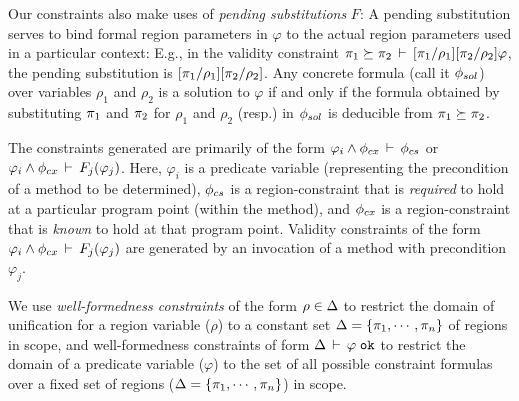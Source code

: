 
Our constraints also make uses of \emph{pending substitutions} $F$:
A pending substitution serves to bind formal region parameters in $\varphi$ to the actual region parameters
used in a particular context:
E.g., in the validity constraint $\pi_1 \succeq
\pi_2\,\vdash\,[\pi_1/\rho_1][\pi_2/\rho_2]\varphi$, the pending substitution
is $[\pi_1/\rho_1][\pi_2/\rho_2]$. Any concrete formula (call it
$\phi_{sol}$) over variables $\rho_1$ and $\rho_2$ is a solution to
$\varphi$ if and only if the formula obtained by substituting $\pi_1$
and $\pi_2$ for $\rho_1$ and $\rho_2$ (resp.) in $\phi_{sol}$ is
deducible from $\pi_1 \succeq \pi_2$.

The constraints generated are primarily of the form $\varphi_i \wedge \phi_{cx}\,\vdash\,\phi_{cs}$
or $\varphi_i \wedge \phi_{cx}\,\vdash\,F_j(\varphi_j)$.  Here, $\varphi_i$ is a predicate variable
(representing the precondition of a method to be determined), $\phi_{cs}$ is a region-constraint
that is \emph{required} to hold at a particular program point (within the method), and $\phi_{cx}$ is
a region-constraint that is \emph{known} to hold at that program point.
Validity constraints of the form $\varphi_i \wedge \phi_{cx}\,\vdash\,F_j(\varphi_j)$
are generated by an invocation of a method with precondition $\varphi_j$.

We use \emph{well-formedness constraints} of the form $\rho \in \Delta$
to restrict the domain of unification for a region variable ($\rho$)
to a constant set $\Delta = \{ \pi_1, \cdots, \pi_n \}$ of regions in scope,
and  well-formedness constraints of form $\Delta\,\vdash\,\varphi \; \texttt{ok}$ to
restrict the domain of a predicate variable ($\varphi$) to the set of all possible
constraint formulas over a fixed set of  regions ($\Delta = \{ \pi_1, \cdots, \pi_n \}$) in scope.


